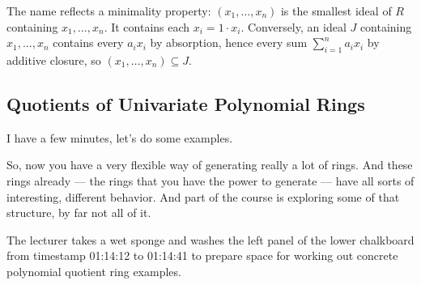 \begin{aiNote}
The name  reflects a minimality property: $(x_1, \dots, x_n)$ is the smallest ideal of $R$ containing $x_1, \dots, x_n$. It contains each $x_i = 1 \cdot x_i$. Conversely, an ideal $J$ containing $x_1, \dots, x_n$ contains every $a_i x_i$ by absorption, hence every sum $\sum_{i=1}^n a_i x_i$ by additive closure, so $(x_1, \dots, x_n) \subseteq J$.
\end{aiNote}

\subsection{Quotients of Univariate Polynomial Rings}

\begin{speech}[01:13:39 - 01:14:41]
I have a few minutes, let's do some examples. 

So, now you have a very flexible way of generating really a lot of rings. And these rings already --- the rings that you have the power to generate --- have all sorts of interesting, different behavior. And part of the course is exploring some of that structure, by far not all of it.
\end{speech}

\begin{note}
The lecturer takes a wet sponge and washes the left panel of the lower chalkboard from timestamp 01:14:12 to 01:14:41 to prepare space for working out concrete polynomial quotient ring examples.
\end{note}

